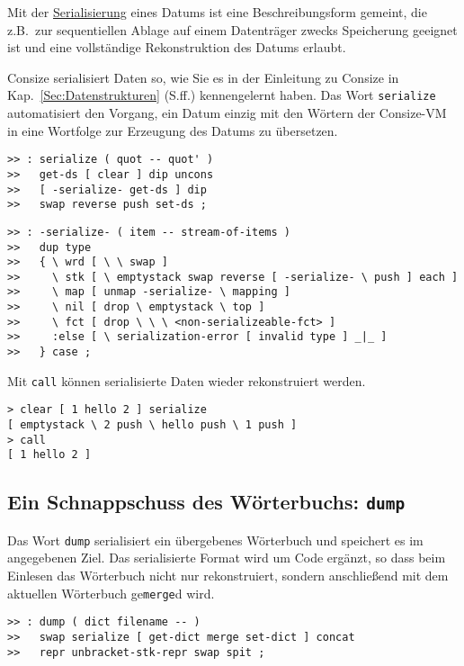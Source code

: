 Mit der \href{http://en.wikipedia.org/wiki/Serialization}{Serialisierung} eines Datums ist eine Beschreibungsform gemeint, die z.B.\ zur sequentiellen Ablage auf einem Datenträger zwecks Speicherung geeignet ist und eine vollständige Rekonstruktion des Datums erlaubt.

Consize serialisiert Daten so, wie Sie es in der Einleitung zu Consize in Kap.~\ref{Sec:Datenstrukturen} (S.\pageref{Sec:Datenstrukturen}ff.) kennengelernt haben. Das Wort \verb|serialize| automatisiert den Vorgang, ein Datum einzig mit den Wörtern der Consize-VM in eine Wortfolge zur Erzeugung des Datums zu übersetzen.

\begin{verbatim}
>> : serialize ( quot -- quot' )
>>   get-ds [ clear ] dip uncons     
>>   [ -serialize- get-ds ] dip
>>   swap reverse push set-ds ;
\end{verbatim}

\begin{verbatim}  
>> : -serialize- ( item -- stream-of-items )
>>   dup type
>>   { \ wrd [ \ \ swap ] 
>>     \ stk [ \ emptystack swap reverse [ -serialize- \ push ] each ]
>>     \ map [ unmap -serialize- \ mapping ]
>>     \ nil [ drop \ emptystack \ top ]
>>     \ fct [ drop \ \ \ <non-serializeable-fct> ]
>>     :else [ \ serialization-error [ invalid type ] _|_ ]
>>   } case ;
\end{verbatim}

Mit \verb|call| können serialisierte Daten wieder rekonstruiert werden.

\begin{verbatim}
> clear [ 1 hello 2 ] serialize
[ emptystack \ 2 push \ hello push \ 1 push ]
> call
[ 1 hello 2 ]
\end{verbatim}

\subsection{Ein Schnappschuss des Wörterbuchs: \texttt{dump}}

Das Wort \verb|dump| serialisiert ein übergebenes Wörterbuch und speichert es im angegebenen Ziel. Das serialisierte Format wird um Code ergänzt, so dass beim Einlesen das Wörterbuch nicht nur rekonstruiert, sondern anschließend mit dem aktuellen Wörterbuch ge\verb|merge|d wird.

\begin{verbatim}
>> : dump ( dict filename -- )
>>   swap serialize [ get-dict merge set-dict ] concat
>>   repr unbracket-stk-repr swap spit ;
\end{verbatim}

